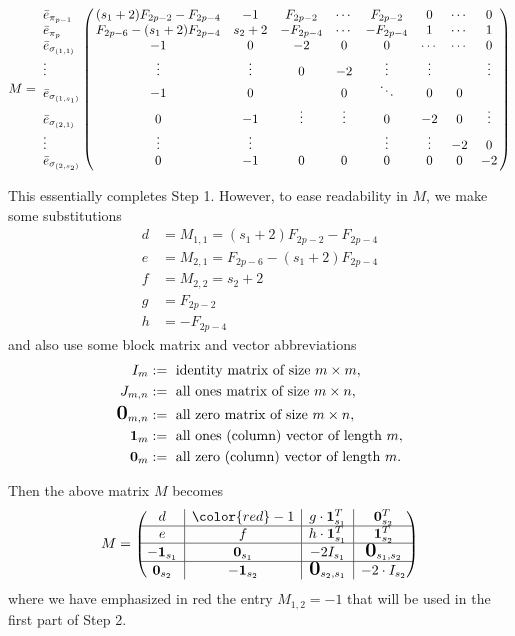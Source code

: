 \documentclass[10pt,reqno]{amsart}
\newcommand{\bigzero}{\mbox{\normalfont\Large\bfseries 0}}
\newcommand{\rvline}{\hspace*{-\arraycolsep}\vline\hspace*{-\arraycolsep}}
\def\onesvector{\mathbf{1}}
\def\zerovector{\mathbf{0}}
\begin{document}
\begin{equation}
\label{M-matrix}
M =
\bordermatrix{~ &  &  &  &  & &  \cr
\bar{e}_{\pi_{p-1}}&(s_1+2) F_{2p-2} - F_{2p-4}  &-1    & F_{2p-2}   &\cdots     &F_{2p-2}& 0&\cdots &0 \cr
\bar{e}_{\pi_{p}}  & F_{2p-6} - (s_1+2)F_{2p-4}  &s_2+2 & -F_{2p-4}  & \cdots & -F_{2p-4}   &1& \cdots &1\cr
\bar{e}_{\sigma_{(1,1)}} & -1                    & 0     & -2        & 0 &  0   & 
\cdots&\cdots& 0 \cr
\vdots             & \vdots                      & \vdots&0          & -2 &     \vdots &\vdots&  &\vdots  \cr
\bar{e}_{\sigma_{(1,s_1)}} & -1                  & 0     &           & 0 &    \ddots&0& 0&  \cr
\bar{e}_{\sigma_{(2,1)}} & 0                     & -1    &\vdots     & \vdots &    0 &-2& 0& 
\vdots \cr
\vdots             & \vdots                      & \vdots &          &  &    \vdots &\vdots&-2  &0  \cr
\bar{e}_{\sigma_{(2,s_2)}} & 0                   & -1     &0        & 0 &    0&0& 0& -2\cr
}
\end{equation}

\medskip
\noindent
This essentially completes {\sf Step 1}. However, to ease readability in $M$, we make some substitutions 
\begin{align*}
 d &=M_{1,1}= (s_1+2)F_{2p-2}-F_{2p-4} \\
 e &=M_{2,1}= F_{2p-6}-(s_1+2)F_{2p-4}\\
 f &=M_{2,2}= s_2+2\\
 g &= F_{2p-2}\\
 h &= -F_{2p-4}
\end{align*}
and also use some block matrix and vector abbreviations
\def\onesvector{\mathbf{1}}
\def\zerovector{\mathbf{0}}
\begin{align*}
    I_m&:=\text{ identity matrix of size }m \times m,\\
    J_{m,n}&:=\text{ all ones matrix of size }m \times n,\\
    \bigzero_{m,n}&:=\text{ all zero matrix of size }m \times n,\\
    \onesvector_m&:=\text{ all ones (column) vector of length }m,\\
    \zerovector_m&:=\text{ all zero (column) vector of length }m.
\end{align*}

Then the above matrix $M$ becomes
\begin{equation}
\label{M-abbreviated}
M=\begin{pmatrix}
d & \rvline & {\color{red}-1} & \rvline & g\cdot\onesvector^T_{s_1} & \rvline & \zerovector^T_{s_2}  \\
\hline
e & \rvline & f & \rvline & h\cdot\onesvector^T_{s_1} &\rvline & \onesvector^T_{s_2}  \\
\hline
-\onesvector_{s_1} & \rvline & \zerovector_{s_1} & \rvline & -2 I_{s_1}& \rvline & \bigzero_{s_1,s_2} \\
\hline
\zerovector_{s_2} & \rvline & -\onesvector_{s_2} & \rvline & \bigzero_{s_2,s_1}& \rvline & -2\cdot I_{s_2} 

\end{pmatrix}
\end{equation}
where we have emphasized in red the entry $M_{1,2}=-1$ that will be used in the first part of {\sf Step 2}.
\end{document}
